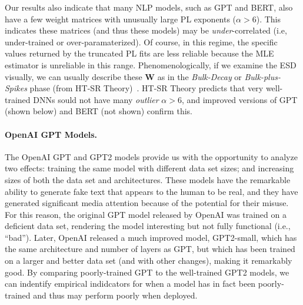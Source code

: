 
Our results also indicate that many NLP models, such as GPT and BERT, also have a few weight matrices with unusually large PL exponents ($\alpha>6$).
This indicates these matrices (and thus these models) may be \emph{under}-correlated (i.e, under-trained or over-paramaterized).
Of course, in this regime, the specific values returned by the truncated PL fits are less reliable because the MLE estimator is unreliable in this range. 
Phenomenologically, if we examine the ESD visually, we can usually describe these $\mathbf{W}$ as in the \emph{Bulk-Decay} or \emph{Bulk-plus-Spikes} phase (from HT-SR Theory)~\cite{MM18_TR,MM19_HTSR_ICML}.
HT-SR Theory predicts that very well-trained DNNs sould not have many \emph{outlier} $\alpha>6$, and improved versions of GPT (shown below) and BERT (not shown) confirm this.

\paragraph{OpenAI GPT Models.}

The OpenAI GPT and GPT2 models provide us with the opportunity to analyze two effects: training the same model with different data set sizes; and increasing sizes of both the data set and architectures.
These models have the remarkable ability to generate fake text that appears to the human to be real, and they have generated significant media attention because of the potential for their misuse.
For this reason, the original GPT model released by OpenAI was trained on a deficient data set, rendering the model interesting but not fully functional (i.e., ``bad'').  
Later, OpenAI released a much improved model, GPT2-small, which has the same architecture and number of layers as GPT, but which has been trained on a larger and better data set (and with other changes), making it remarkably good.
%
By comparing poorly-trained GPT to the well-trained GPT2 models, we can indentify empirical indidcators for when a model has in fact been poorly-trained and thus may perform poorly when deployed.

